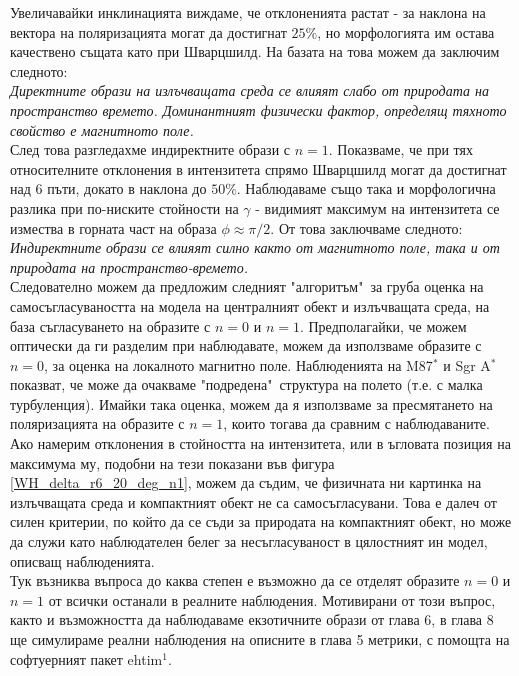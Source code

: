 Увеличавайки инклинацията виждаме, че отклоненията растат - за наклона на вектора на поляризацията могат да достигнат $25\%$, но морфологията им остава качествено същата като при Шварцшилд. На базата на това можем да заключим следното:\\

\emph{Директните образи на излъчващата среда се влияят слабо от природата на пространство времето. Доминантният физически фактор, определящ тяхното свойство е магнитното поле.}\\

След това разгледахме индиректните образи с $n = 1$. Показваме, че при тях относителните отклонения в интензитета спрямо Шварцшилд могат да достигнат над 6 пъти, докато в наклона до $50\%$. Наблюдаваме също така и морфологична разлика при по-ниските стойности на $\gamma$ - видимият максимум на интензитета се измества в горната част на образа $\phi\approx\pi / 2$. От това заключваме следното:\\

\emph{Индиректните образи се влияят силно както от магнитното поле, така и от природата на пространство-времето.}\\

Следователно можем да предложим следният "алгоритъм"$\,$ за груба оценка на самосъгласуваността на модела на централният обект и излъчващата среда, на база съгласуването на образите с $n = 0$ и $n = 1$. Предполагайки, че можем оптически да ги разделим при наблюдавате, можем да използваме образите с $n = 0$, за оценка на локалното магнитно поле. Наблюденията на M87$^*$ и Sgr A$^*$ показват, че може да очакваме "подредена"$\,$ структура на полето (т.е. с малка турбуленция). Имайки така оценка, можем да я използваме за пресмятането на поляризацията на образите с $n = 1$, които тогава да сравним с наблюдаваните. Ако намерим отклонения в стойността на интензитета, или в ъгловата позиция на максимума му, подобни на тези показани във фигура \ref{WH_delta_r6_20_deg_n1}, можем да съдим, че физичната ни картинка на излъчващата среда и компактният обект не са самосъгласувани. Това е далеч от силен критерии, по който да се съди за природата на компактният обект, но може да служи като наблюдателен белег за несъгласуваност в цялостният ин модел, описващ наблюденията.\\

Тук възниква въпроса до каква степен е възможно да се отделят образите $n = 0$ и $n = 1$ от всички останали в реалните наблюдения. Мотивирани от този въпрос, както и възможността да наблюдаваме екзотичните образи от глава 6, в глава 8 ще симулираме реални наблюдения на описните в глава 5 метрики, с помощта на софтуерният пакет ehtim$^1$.

